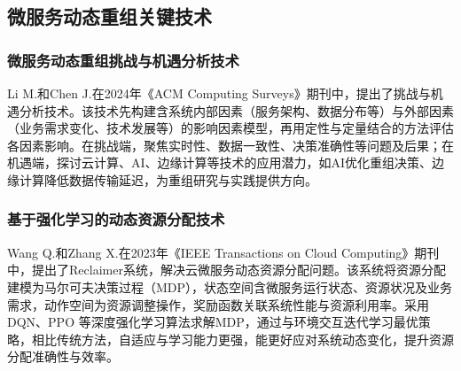 \documentclass[lang=cn,11pt,a4paper,cite=number]{elegantpaper}
\begin{document}
\subsection{微服务动态重组关键技术}
\subsubsection{微服务动态重组挑战与机遇分析技术}
\label{sec:x1}
Li M.和Chen J.在2024年《ACM Computing Surveys》期刊中，提出了挑战与机遇分析技术。该技术先构建含系统内部因素（服务架构、数据分布等）与外部因素（业务需求变化、技术发展等）的影响因素模型，再用定性与定量结合的方法评估各因素影响。在挑战端，聚焦实时性、数据一致性、决策准确性等问题及后果；在机遇端，探讨云计算、AI、边缘计算等技术的应用潜力，如AI优化重组决策、边缘计算降低数据传输延迟，为重组研究与实践提供方向。
\cite{acmsurvey2024dynamic}
\subsubsection{基于强化学习的动态资源分配技术}
\label{sec:x1}
Wang Q.和Zhang X.在2023年《IEEE Transactions on Cloud Computing》期刊中，提出了Reclaimer系统，解决云微服务动态资源分配问题。该系统将资源分配建模为马尔可夫决策过程（MDP），状态空间含微服务运行状态、资源状况及业务需求，动作空间为资源调整操作，奖励函数关联系统性能与资源利用率。采用DQN、PPO 等深度强化学习算法求解MDP，通过与环境交互迭代学习最优策略，相比传统方法，自适应与学习能力更强，能更好应对系统动态变化，提升资源分配准确性与效率。
\cite{tcc2023reclaimer}
\end{document}
